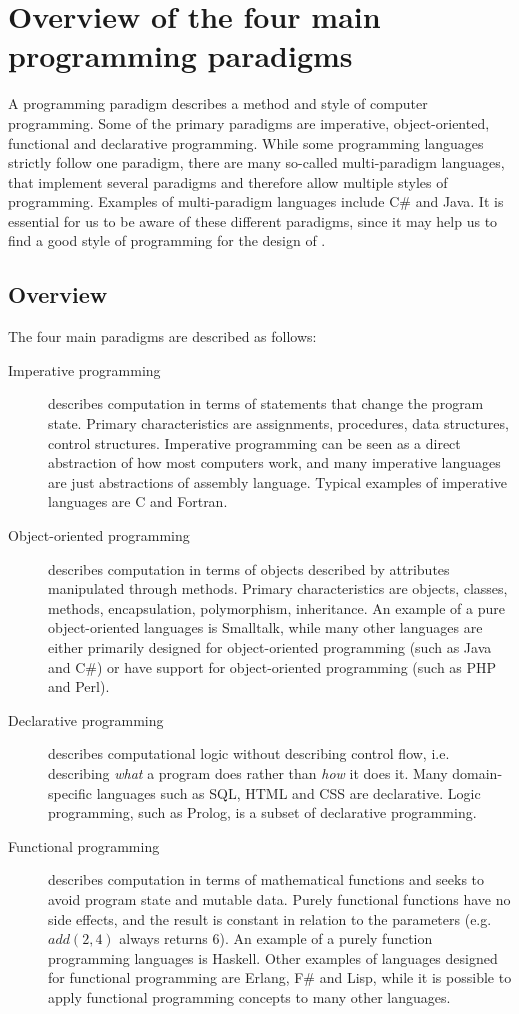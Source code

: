 \section{Overview of the four main programming paradigms}
\label{sec:paradigms}

A programming paradigm describes a method and style of computer programming.
Some of the primary paradigms are imperative, object-oriented, functional and
declarative programming. While some programming languages strictly follow one
paradigm, there are many so-called multi-paradigm languages, that implement
several paradigms and therefore allow multiple styles of programming. Examples
of multi-paradigm languages include C\# and Java. It is essential for us to be
aware of these different paradigms, since it may help us to find a good style of
programming for the design of \productname{}.

\subsection{Overview}
The four main paradigms are described as follows:\cite{fourparadigms}
\begin{description}
\item[Imperative programming] describes computation in terms of statements that
  change the program state. Primary characteristics are assignments, procedures,
  data structures, control structures. Imperative programming can be seen as a
  direct abstraction of how most computers work, and many imperative languages
  are just abstractions of assembly language. Typical examples of imperative
  languages are C and Fortran.
\item[Object-oriented programming] describes computation in terms of objects
  described by attributes manipulated through methods. Primary characteristics
  are objects, classes, methods, encapsulation, polymorphism, inheritance. An
  example of a pure object-oriented languages is Smalltalk, while many other
  languages are either primarily designed for object-oriented programming (such
  as Java and C\#) or have support for object-oriented programming (such as PHP
  and Perl).
\item[Declarative programming] describes computational logic without describing
  control flow, i.e. describing {\em what} a program does rather than {\em how}
  it does it. Many domain-specific languages such as SQL, HTML and CSS are
  declarative. Logic programming, such as Prolog, is a subset of declarative
  programming.
\item[Functional programming] describes computation in terms of mathematical
  functions and seeks to avoid program state and mutable data. Purely functional
  functions have no side effects, and the result is constant in relation to the
  parameters (e.g. $add(2, 4)$ always returns $6$). An example of a purely
  function programming languages is Haskell. Other examples of languages
  designed for functional programming are Erlang, F\# and Lisp, while it is
  possible to apply functional programming concepts to many other languages.
\end{description}


